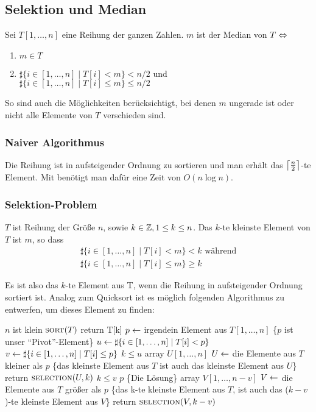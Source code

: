 \documentclass[a4paper,twoside,DIV15,BCOR12mm]{scrbook}
\begin{document}

\subsection{Selektion und Median}
Sei $T[1, \ldots, n]$ eine Reihung der ganzen Zahlen. $m$ ist der Median von $T \Leftrightarrow$

\begin{enumerate}
	\item $m \in T$
	\item $\sharp\{i \in [1, \ldots, n] \mid T[i] < m \} < n/2$ und \\
				$\sharp\{i \in [1, \ldots, n] \mid T[i] \leq m\} \leq n/2$
\end{enumerate}
So sind auch die Möglichkeiten berücksichtigt, bei denen  $m$ ungerade ist oder nicht alle Elemente von $T$ verschieden sind.

\subsubsection{Naiver Algorithmus}
Die Reihung ist in aufsteigender Ordnung zu sortieren und man erhält das $\left\lceil\frac{n}{2}\right\rceil$-te Element.
Mit  benötigt man dafür eine Zeit von $O(n \log n)$.

\subsubsection{Selektion-Problem}
$T$ ist Reihung der Größe $n$, sowie $k \in \mathbb{Z}, 1 \leq k \leq n$. Das $k$-te kleinste Element von $T$ ist $m$, so dass
$$\begin{array}{l}
	\sharp\{i \in [1, \ldots, n] \mid T[i] < m \} < k \text{ während} \\
	\sharp\{i \in [1, \ldots, n] \mid T[i] \leq m\} \geq k
\end{array}$$

Es ist also das $k$-te Element aus T, wenn die Reihung in aufsteigender Ordnung sortiert ist.
Analog zum Quicksort ist es möglich folgenden Algorithmus zu entwerfen, um dieses Element zu finden:

\begin{codebox}
\li \If $n$ ist klein
\li		\Then $\textnormal{\scshape sort}(T)$
\li 				return T[k]
		\End
\li $p \leftarrow$ irgendein Element aus $T[1, \ldots, n]$
\zi \{$p$ ist unser "`Pivot"'-Element\}
\li	$u \leftarrow \sharp\{i \in [1, \ldots, n] \mid T[i] < p \}$
\li	$v \leftarrow \sharp\{i \in [1, \ldots, n] \mid T[i] \leq p \}$
\li \If $k \leq u$
\li 	\Then array $U[1, \ldots, n]$
\li 	$U \leftarrow$ die Elemente aus $T$ kleiner als $p$
\zi 	\{das kleinste Element aus $T$ ist auch das kleinste Element aus $U$\}
\li		return $\textnormal{\scshape selection}(U,k)$
		\End
\li \If $k \leq v$
\li 	\Then \Return $p$ \{Die Lösung\}
\li 	\Else array $V[1, \ldots, n-v]$
\li 				$V \leftarrow$ die Elemente aus $T$ größer als $p$
\zi 				\{das k-te kleinste Element aus $T$, ist auch das ($k-v$)-te kleinste Element aus $V$\}
\li 				return $\textnormal{\scshape selection}(V, k-v)$
		\End
\end{codebox}
\end{document}
